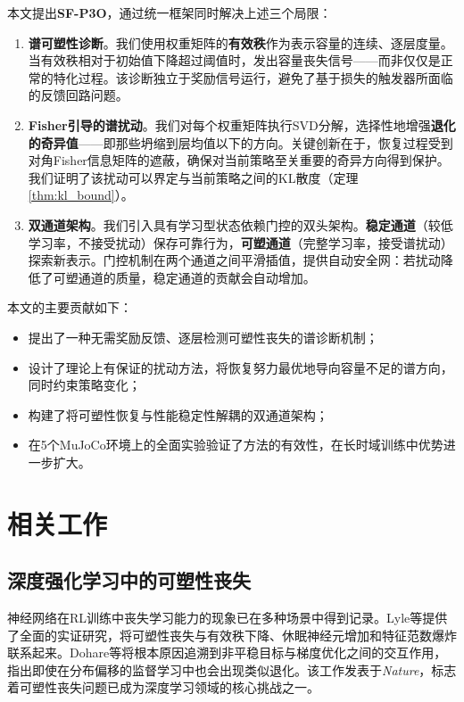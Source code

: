 \documentclass[twocolumn]{article}
\begin{document}
本文提出\textbf{SF-P3O}，通过统一框架同时解决上述三个局限：

\begin{enumerate}[leftmargin=*]
    \item \textbf{谱可塑性诊断}。我们使用权重矩阵的\textbf{有效秩}\cite{roy2007effective}作为表示容量的连续、逐层度量。当有效秩相对于初始值下降超过阈值时，发出容量丧失信号——而非仅仅是正常的特化过程。该诊断独立于奖励信号运行，避免了基于损失的触发器所面临的反馈回路问题。

    \item \textbf{Fisher引导的谱扰动}。我们对每个权重矩阵执行SVD分解，选择性地增强\textbf{退化的奇异值}——即那些坍缩到层均值以下的方向。关键创新在于，恢复过程受到对角Fisher信息矩阵的遮蔽，确保对当前策略至关重要的奇异方向得到保护。我们证明了该扰动可以界定与当前策略之间的KL散度（定理\ref{thm:kl_bound}）。

    \item \textbf{双通道架构}。我们引入具有学习型状态依赖门控的双头架构。\textbf{稳定通道}（较低学习率，不接受扰动）保存可靠行为，\textbf{可塑通道}（完整学习率，接受谱扰动）探索新表示。门控机制在两个通道之间平滑插值，提供自动安全网：若扰动降低了可塑通道的质量，稳定通道的贡献会自动增加。
\end{enumerate}

\noindent 本文的主要贡献如下：
\begin{itemize}[leftmargin=*]
    \item 提出了一种无需奖励反馈、逐层检测可塑性丧失的谱诊断机制；
    \item 设计了理论上有保证的扰动方法，将恢复努力最优地导向容量不足的谱方向，同时约束策略变化；
    \item 构建了将可塑性恢复与性能稳定性解耦的双通道架构；
    \item 在5个MuJoCo环境上的全面实验验证了方法的有效性，在长时域训练中优势进一步扩大。
\end{itemize}


\section{相关工作}
\label{sec:related}

\subsection{深度强化学习中的可塑性丧失}

神经网络在RL训练中丧失学习能力的现象已在多种场景中得到记录\cite{lyle2023understanding,dohare2024loss,nikishin2022primacy,kumar2020implicit}。Lyle等\cite{lyle2023understanding}提供了全面的实证研究，将可塑性丧失与有效秩下降、休眠神经元增加和特征范数爆炸联系起来。Dohare等\cite{dohare2024loss}将根本原因追溯到非平稳目标与梯度优化之间的交互作用，指出即使在分布偏移的监督学习中也会出现类似退化。该工作发表于\emph{Nature}，标志着可塑性丧失问题已成为深度学习领域的核心挑战之一。
\end{document}
